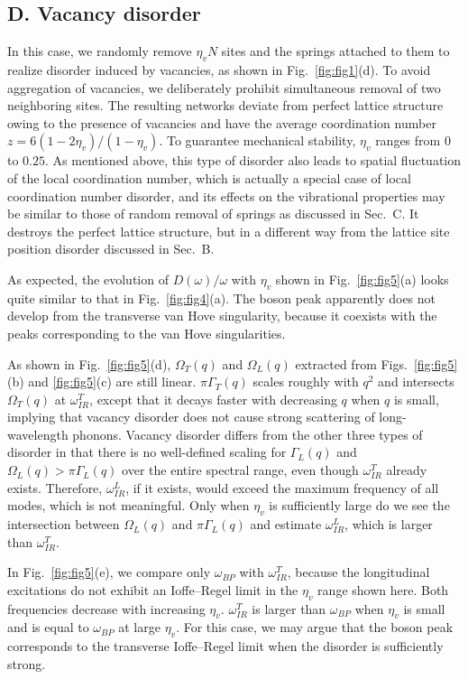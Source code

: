 \documentclass[twocolumn,printnumbers,amsmath,amssymb,prl,verbatim]{revtex4}
\begin{document}
\subsection{D. Vacancy disorder}
\label{subsec:vacancy}

In this case, we randomly remove $\eta_v N$ sites and the springs attached to them to realize disorder induced by vacancies, as shown in Fig.~\ref{fig:fig1}(d). To avoid aggregation of vacancies, we deliberately prohibit simultaneous removal of two neighboring sites. The resulting networks deviate from perfect lattice structure owing to the presence of vacancies and have the average coordination number $z=6(1 - 2\eta_v) / (1 - \eta_v)$. To guarantee mechanical stability, $\eta_v$ ranges from $0$ to $0.25$. As mentioned above, this type of disorder also leads to spatial fluctuation of the local coordination number, which is actually a special case of local coordination number disorder, and its effects on the vibrational properties may be similar to those of random removal of springs as discussed in Sec.~C. It destroys the perfect lattice structure, but in a different way from the lattice site position disorder discussed in Sec.~B.

As expected, the evolution of $D(\omega)/\omega$ with $\eta_v$ shown in Fig.~\ref{fig:fig5}(a) looks quite similar to that in Fig.~\ref{fig:fig4}(a). The boson peak apparently does not develop from the transverse van Hove singularity, because it coexists with the peaks corresponding to the van Hove singularities.

As shown in Fig.~\ref{fig:fig5}(d), $\Omega_T(q)$ and $\Omega_L(q)$ extracted from Figs.~\ref{fig:fig5}(b) and \ref{fig:fig5}(c) are still linear. $\pi\Gamma_T(q)$ scales roughly with $q^2$ and intersects $\Omega_T(q)$ at $\omega_{IR}^T$, except that it decays faster with decreasing $q$ when $q$ is small, implying that vacancy disorder does not cause strong scattering of long-wavelength phonons. Vacancy disorder differs from the other three types of disorder in that there is no well-defined scaling for $\Gamma_L(q)$ and $\Omega_L(q)>\pi\Gamma_L(q)$ over the entire spectral range, even though $\omega_{IR}^T$ already exists. Therefore, $\omega_{IR}^L$, if it exists, would exceed the maximum frequency of all modes, which is not meaningful. Only when $\eta_v$ is sufficiently large do we see the intersection between $\Omega_L(q)$ and $\pi\Gamma_L(q)$ and estimate $\omega_{IR}^L$, which is larger than $\omega_{IR}^T$.

In Fig.~\ref{fig:fig5}(e), we compare only $\omega_{BP}$ with $\omega_{IR}^T$, because the longitudinal excitations do not exhibit an Ioffe--Regel limit in the $\eta_v$ range shown here. Both frequencies decrease with increasing $\eta_v$. $\omega_{IR}^T$ is larger than $\omega_{BP}$ when $\eta_v$ is small and is equal to $\omega_{BP}$ at large $\eta_v$. For this case, we may argue that the boson peak corresponds to the transverse Ioffe--Regel limit when the disorder is sufficiently strong.
\end{document}
